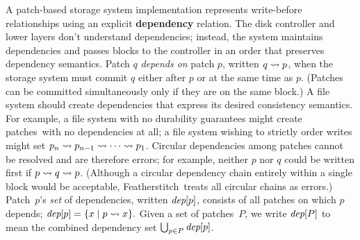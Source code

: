 \documentclass[9pt,twocolumn,letterpaper]{article}
\newcommand{\Kudos}{Featherstitch}
\newcommand{\patches}{patches}
\newcommand{\Patch}{Patch}
\begin{document}
A patch-based storage system implementation represents write-before
 relationships using an explicit \textbf{dependency} relation.
%
The disk controller and lower layers don't understand dependencies; instead,
 the system
 maintains dependencies and passes blocks to the controller in an
 order that preserves dependency semantics.
%
Patch $q$ \emph{depends on} patch $p$, written $q \leadsto p$,
 when the storage system must commit $q$ either after $p$ or at the same
 time as $p$.
%
(Patches can be committed simultaneously only if they are on the same block.)
%
A file system should create dependencies that express its desired consistency
 semantics.
%
For example, a file system with no durability
 guarantees might create \patches\ with no dependencies at all;
%
a file system wishing to strictly order writes might set
 $p_n \leadsto p_{n-1} \leadsto \cdots \leadsto p_1$.
%
%
%
Circular dependencies among patches cannot be resolved and are therefore
 errors;  for example, neither $p$ nor $q$ could be written first
 if $p \leadsto q \leadsto p$.
%
(Although a circular dependency chain entirely within a single block would be
 acceptable, \Kudos\ treats all circular chains as errors.)
%
\Patch\ $p$'s \emph{set} of dependencies, written $\textit{dep}[p]$, consists
 of all patches on which $p$ depends;
%
\( \textit{dep}[p] = \{ x \mid p \leadsto x \}. \)
%
Given a set of \patches\ $P$, we write $\textit{dep}[P]$ to mean the
 combined dependency set $\bigcup_{p\in P} \textit{dep}[p]$. 
\end{document}
